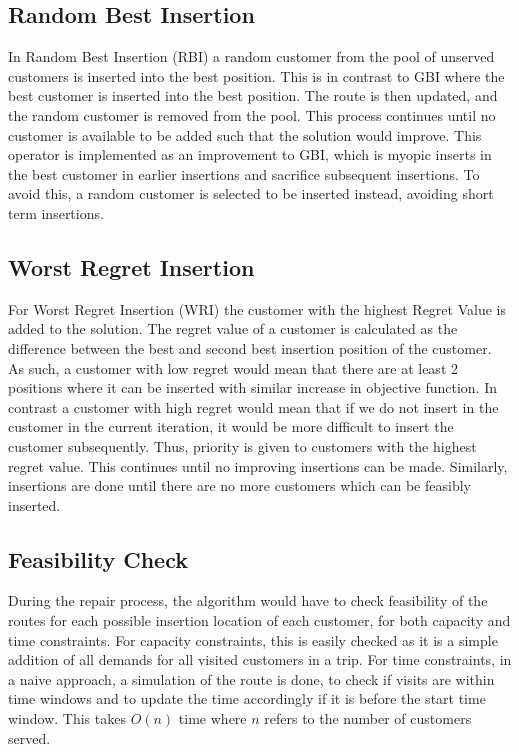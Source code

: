 \subsection{Random Best Insertion}
In Random Best Insertion (RBI) a random customer from the pool of unserved customers is inserted into the best position. This is in contrast to GBI where the best customer is inserted into the best position. The route is then updated, and the random customer is removed from the pool. This process continues until no customer is available to be added such that the solution would improve. This operator is implemented as an improvement to GBI, which is myopic inserts in the best customer in earlier insertions and sacrifice subsequent insertions. To avoid this, a random customer is selected to be inserted instead, avoiding short term insertions.

\subsection{Worst Regret Insertion}
For Worst Regret Insertion (WRI) the customer with the highest Regret Value is added to the solution. The regret value of a customer is calculated as the difference between the best and second best insertion position of the customer. As such, a customer with low regret would mean that there are at least 2 positions where it can be inserted with similar increase in objective function. In contrast a customer with high regret would mean that if we do not insert in the customer in the current iteration, it would be more difficult to insert the customer subsequently. Thus, priority is given to customers with the highest regret value. This continues until no improving insertions can be made. Similarly, insertions are done until there are no more customers which can be feasibly inserted.


\subsection{Feasibility Check}
During the repair process, the algorithm would have to check feasibility of the routes for each possible insertion location of each customer, for both capacity and time constraints. For capacity constraints, this is easily checked as it is a simple addition of all demands for all visited customers in a trip. For time constraints, in a naive approach, a simulation of the route is done, to check if visits are within time windows and to update the time accordingly if it is before the start time window. This takes $O(n)$ time where $n$ refers to the number of customers served.

